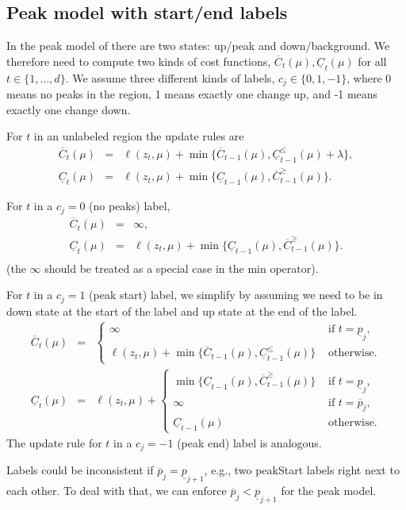 \documentclass{article}
\begin{document}
\subsection{Peak model with start/end labels}

In the peak model of \citet{Hocking2020jmlr} there are two states:
up/peak and down/background. We therefore need to compute two kinds of
cost functions, $\overline C_t(\mu),\underline C_t(\mu)$ for all
$t\in\{1,\dots,d\}$. We assume three different kinds of labels,
$c_j\in\{0,1,-1\}$, where 0 means no peaks in the region, 1 means
exactly one change up, and -1 means exactly one change down.

For $t$ in an unlabeled region the update rules are
\begin{eqnarray}
  \overline C_t(\mu)
  &=& \ell(z_t, \mu) + \min\{
      \overline C_{t-1}(\mu),
      \underline C_{t-1}^\leq(\mu) + \lambda
      \}, \\
  \underline C_t(\mu)
  &=& \ell(z_t, \mu) + \min\{
      \underline C_{t-1}(\mu),
      \overline C_{t-1}^\geq(\mu)
      \}.
\end{eqnarray}

For $t$ in a $c_j=0$ (no peaks) label,
\begin{eqnarray}
  \label{eq:c0peak}
  \overline C_t(\mu)
  &=& \infty,
  \\
  \underline C_t(\mu)
  &=& \ell(z_t, \mu) + \min\{
      \underline C_{t-1}(\mu),
      \overline C_{t-1}^\geq(\mu)
      \}. \\
\end{eqnarray}
(the $\infty$ should be treated as a special case in the min operator).

For $t$ in a $c_j=1$ (peak start) label, we simplify by assuming we
need to be in down state at the start of the label and up state at the
end of the label.
\begin{eqnarray}
  \label{eq:c1peak}
  \overline C_t(\mu)
  &=& \begin{cases}
    \infty & \text{ if } t=\underline p_j,\\
    \ell(z_t, \mu) + \min\{
    \overline C_{t-1}(\mu),
    \underline C_{t-1}^\leq(\mu) 
    \} &  \text{ otherwise.}
  \end{cases} \\
  \underline C_t(\mu)
  &=& \ell(z_t, \mu) + \begin{cases}
    \min\{
    \underline C_{t-1}(\mu),
    \overline C_{t-1}^\geq(\mu)
    \} & \text{ if } t=\underline p_j,\\
    \infty & \text{ if }t=\overline p_j,\\
    \underline C_{t-1}(\mu) & \text{ otherwise.}
  \end{cases} 
\end{eqnarray}
The update rule for $t$ in a $c_j=-1$ (peak end) label is analogous.

Labels could be inconsistent if $\overline p_j = \underline p_{j+1}$,
e.g., two peakStart labels right next to each other. To deal with
that, we can enforce $\overline p_j < \underline p_{j+1}$ for the peak model.



\end{document}
